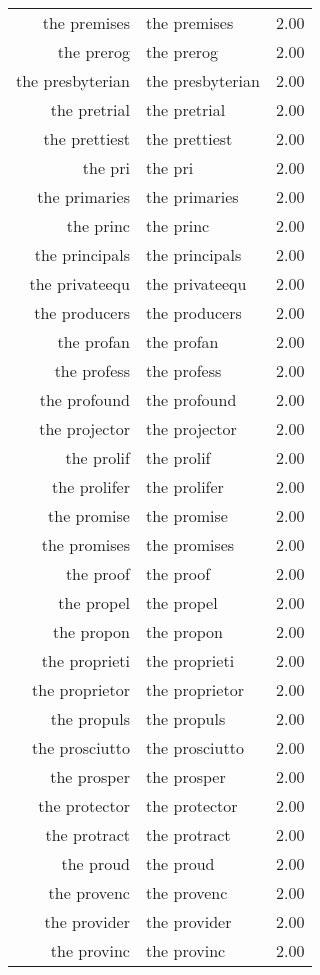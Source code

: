 \begin{table}[ht]
\begin{tabular}{rlr}
  the premises & the premises & 2.00 \\ 
  the prerog & the prerog & 2.00 \\ 
  the presbyterian & the presbyterian & 2.00 \\ 
  the pretrial & the pretrial & 2.00 \\ 
  the prettiest & the prettiest & 2.00 \\ 
  the pri & the pri & 2.00 \\ 
  the primaries & the primaries & 2.00 \\ 
  the princ & the princ & 2.00 \\ 
  the principals & the principals & 2.00 \\ 
  the privateequ & the privateequ & 2.00 \\ 
  the producers & the producers & 2.00 \\ 
  the profan & the profan & 2.00 \\ 
  the profess & the profess & 2.00 \\ 
  the profound & the profound & 2.00 \\ 
  the projector & the projector & 2.00 \\ 
  the prolif & the prolif & 2.00 \\ 
  the prolifer & the prolifer & 2.00 \\ 
  the promise & the promise & 2.00 \\ 
  the promises & the promises & 2.00 \\ 
  the proof & the proof & 2.00 \\ 
  the propel & the propel & 2.00 \\ 
  the propon & the propon & 2.00 \\ 
  the proprieti & the proprieti & 2.00 \\ 
  the proprietor & the proprietor & 2.00 \\ 
  the propuls & the propuls & 2.00 \\ 
  the prosciutto & the prosciutto & 2.00 \\ 
  the prosper & the prosper & 2.00 \\ 
  the protector & the protector & 2.00 \\ 
  the protract & the protract & 2.00 \\ 
  the proud & the proud & 2.00 \\ 
  the provenc & the provenc & 2.00 \\ 
  the provider & the provider & 2.00 \\ 
  the provinc & the provinc & 2.00 \\ 

\end{tabular}
\end{table}
